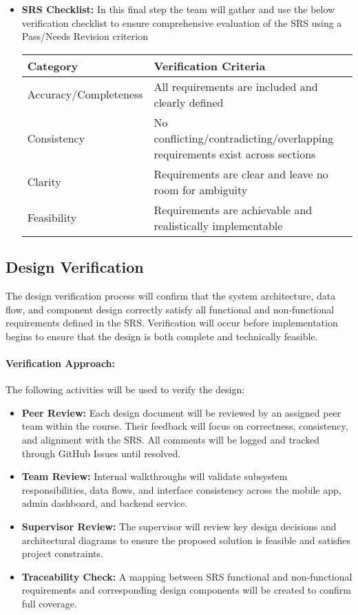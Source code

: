 \documentclass[12pt, titlepage]{article}
\begin{document}
\begin{itemize}
    \item \textbf{SRS Checklist:} In this final step the team will gather and use the below verification checklist to ensure comprehensive evaluation of the SRS using a Pass/Needs Revision criterion
    \begin{center}
    \begin{tabular}{|p{4cm}|p{9cm}|}
        \hline
        \textbf{Category} & \textbf{Verification Criteria} \\ \hline
        Accuracy/Completeness & All requirements are included and clearly defined \\ \hline
        Consistency & No conflicting/contradicting/overlapping requirements exist across sections \\ \hline
        Clarity & Requirements are clear and leave no room for ambiguity \\ \hline
        Feasibility & Requirements are achievable and realistically implementable \\ \hline
    \end{tabular}
    \end{center}
\end{itemize}


\subsection{Design Verification}

The design verification process will confirm that the system architecture, data flow, and component design correctly satisfy all functional and non-functional requirements defined in the SRS. Verification will occur before implementation begins to ensure that the design is both complete and technically feasible.

\paragraph{Verification Approach:}The following activities will be used to verify the design:
\begin{itemize}
    \item \textbf{Peer Review:} Each design document will be reviewed by an assigned peer team within the course. Their feedback will focus on correctness, consistency, and alignment with the SRS. All comments will be logged and tracked through GitHub Issues until resolved.
    \item \textbf{Team Review:} Internal walkthroughs will validate subsystem responsibilities, data flows, and interface consistency across the mobile app, admin dashboard, and backend service.
    \item \textbf{Supervisor Review:} The supervisor will review key design decisions and architectural diagrams to ensure the proposed solution is feasible and satisfies project constraints.
    \item \textbf{Traceability Check:} A mapping between SRS functional and non-functional requirements and corresponding design components will be created to confirm full coverage.
\end{itemize}
\end{document}
